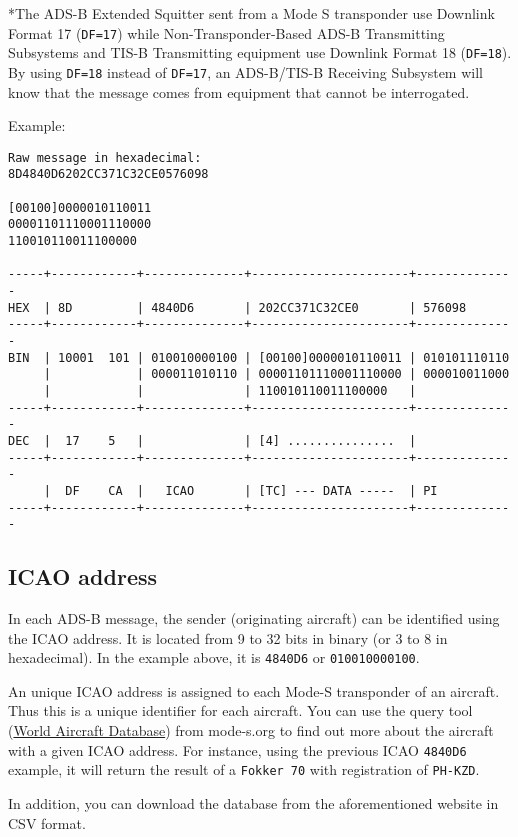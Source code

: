 *The ADS-B Extended Squitter sent from a Mode S transponder use Downlink
Format 17 (\texttt{DF=17}) while Non-Transponder-Based ADS-B
Transmitting Subsystems and TIS-B Transmitting equipment use Downlink
Format 18 (\texttt{DF=18}). By using \texttt{DF=18} instead of
\texttt{DF=17}, an ADS-B/TIS-B Receiving Subsystem will know that the
message comes from equipment that cannot be interrogated.

Example:

\begin{verbatim}
Raw message in hexadecimal:
8D4840D6202CC371C32CE0576098

[00100]0000010110011
00001101110001110000
110010110011100000

-----+------------+--------------+----------------------+--------------
HEX  | 8D         | 4840D6       | 202CC371C32CE0       | 576098
-----+------------+--------------+----------------------+--------------
BIN  | 10001  101 | 010010000100 | [00100]0000010110011 | 010101110110
     |            | 000011010110 | 00001101110001110000 | 000010011000
     |            |              | 110010110011100000   |
-----+------------+--------------+----------------------+--------------
DEC  |  17    5   |              | [4] ...............  |
-----+------------+--------------+----------------------+--------------
     |  DF    CA  |   ICAO       | [TC] --- DATA -----  | PI
-----+------------+--------------+----------------------+--------------
\end{verbatim}

\subsection{ICAO address}\label{icao-address}

In each ADS-B message, the sender (originating aircraft) can be
identified using the ICAO address. It is located from 9 to 32 bits in
binary (or 3 to 8 in hexadecimal). In the example above, it is
\texttt{4840D6} or \texttt{010010000100}.

An unique ICAO address is assigned to each Mode-S transponder of an
aircraft. Thus this is a unique identifier for each aircraft. You can
use the query tool (\href{https://junzis.com/adb/}{World Aircraft
Database}) from mode-s.org to find out more about the aircraft with a
given ICAO address. For instance, using the previous ICAO
\texttt{4840D6} example, it will return the result of a
\texttt{Fokker\ 70} with registration of \texttt{PH-KZD}.

In addition, you can download the database from the aforementioned
website in CSV format.

